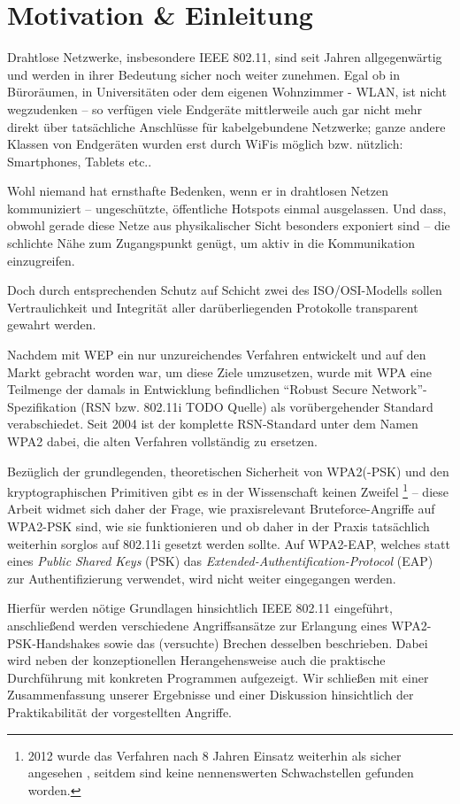 \section{Motivation \& Einleitung}
Drahtlose Netzwerke, insbesondere IEEE 802.11, sind seit Jahren allgegenwärtig und werden in ihrer Bedeutung sicher noch weiter zunehmen. Egal ob in Büroräumen, in Universitäten oder dem eigenen Wohnzimmer - WLAN, ist nicht wegzudenken -- so verfügen viele Endgeräte mittlerweile auch gar nicht mehr direkt über tatsächliche Anschlüsse für kabelgebundene Netzwerke; ganze andere Klassen von Endgeräten wurden erst durch WiFis möglich bzw. nützlich: Smartphones, Tablets etc..

Wohl niemand hat ernsthafte Bedenken, wenn er in drahtlosen Netzen kommuniziert -- ungeschützte, öffentliche Hotspots einmal ausgelassen. Und dass, obwohl gerade diese Netze aus physikalischer Sicht besonders exponiert sind -- die schlichte Nähe zum Zugangspunkt genügt, um aktiv in die Kommunikation einzugreifen.

Doch durch entsprechenden Schutz auf Schicht zwei des ISO/OSI-Modells sollen Vertraulichkeit und Integrität aller darüberliegenden Protokolle transparent gewahrt werden.

Nachdem mit WEP ein nur unzureichendes Verfahren entwickelt und auf den Markt gebracht worden war, um diese Ziele umzusetzen, wurde mit WPA eine Teilmenge der damals in Entwicklung befindlichen \enquote{Robust Secure Network}-Spezifikation (RSN bzw. 802.11i TODO Quelle) als vorübergehender Standard verabschiedet. Seit 2004 ist der komplette RSN-Standard unter dem Namen WPA2 dabei, die alten Verfahren vollständig zu ersetzen.	

Bezüglich der grundlegenden, theoretischen Sicherheit von WPA2(-PSK) und den kryptographischen Primitiven gibt es in der Wissenschaft keinen Zweifel \footnote{2012 wurde das Verfahren nach 8 Jahren Einsatz weiterhin als sicher angesehen \cite{kumkar2012}, seitdem sind keine nennenswerten Schwachstellen gefunden worden.} -- diese Arbeit widmet sich daher der Frage, wie praxisrelevant Bruteforce-Angriffe auf WPA2-PSK sind, wie sie funktionieren und ob daher in der Praxis tatsächlich weiterhin sorglos auf 802.11i gesetzt werden sollte. Auf WPA2-EAP, welches statt eines \textit{Public Shared Keys} (PSK) das \textit{Extended-Authentification-Protocol} (EAP) zur Authentifizierung verwendet, wird nicht weiter eingegangen werden.

Hierfür werden nötige Grundlagen hinsichtlich IEEE 802.11 eingeführt, anschließend werden verschiedene Angriffsansätze zur Erlangung eines WPA2-PSK-Handshakes sowie das (versuchte) Brechen desselben beschrieben. Dabei wird neben der konzeptionellen Herangehensweise auch die praktische Durchführung mit konkreten Programmen aufgezeigt. Wir schließen mit einer Zusammenfassung unserer Ergebnisse und einer Diskussion hinsichtlich der Praktikabilität der vorgestellten Angriffe.
